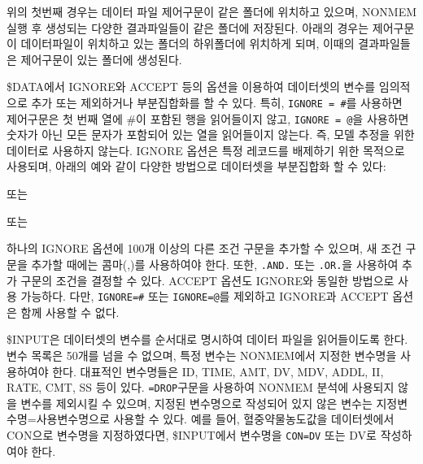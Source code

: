 \documentclass[
  10pt,
  krantz2,
  a4paper]{krantz}
\newenvironment{Shaded}{\begin{snugshade}}{\end{snugshade}}
\newcommand{\CommentTok}[1]{\textcolor[rgb]{0.56,0.35,0.01}{\textit{#1}}}
\newcommand{\NormalTok}[1]{#1}
\newcommand{\OperatorTok}[1]{\textcolor[rgb]{0.81,0.36,0.00}{\textbf{#1}}}
\newcommand{\StringTok}[1]{\textcolor[rgb]{0.31,0.60,0.02}{#1}}
\theoremstyle{definition}
\theoremstyle{definition}
\theoremstyle{definition}
\theoremstyle{remark}
\begin{document}
위의 첫번째 경우는 데이터 파일 제어구문이 같은 폴더에 위치하고 있으며, NONMEM 실행 후 생성되는 다양한 결과파일들이 같은 폴더에 저장된다. 아래의 경우는 제어구문이 데이터파일이 위치하고 있는 폴더의 하위폴더에 위치하게 되며, 이때의 결과파일들은 제어구문이 있는 폴더에 생성된다.

\$DATA에서 IGNORE와 ACCEPT 등의 옵션을 이용하여 데이터셋의 변수를 임의적으로 추가 또는 제외하거나 부분집합화를 할 수 있다. 특히, \texttt{IGNORE\ =\ \#}를 사용하면 제어구문은 첫 번째 열에 \#이 포함된 행을 읽어들이지 않고, \texttt{IGNORE\ =\ @}을 사용하면 숫자가 아닌 모든 문자가 포함되어 있는 열을 읽어들이지 않는다. 즉, 모델 추정을 위한 데이터로 사용하지 않는다. IGNORE 옵션은 특정 레코드를 배제하기 위한 목적으로 사용되며, 아래의 예와 같이 다양한 방법으로 데이터셋을 부분집합화 할 수 있다:

\begin{Shaded}
\end{Shaded}

또는

\begin{Shaded}
\end{Shaded}

또는

\begin{Shaded}
\end{Shaded}

하나의 IGNORE 옵션에 100개 이상의 다른 조건 구문을 추가할 수 있으며, 새 조건 구문을 추가할 때에는 콤마(,)를 사용하여야 한다. 또한, \texttt{.AND.} 또는 \texttt{.OR.}을 사용하여 추가 구문의 조건을 결정할 수 있다. ACCEPT 옵션도 IGNORE와 동일한 방법으로 사용 가능하다. 다만, \texttt{IGNORE=\#} 또는 \texttt{IGNORE=@}를 제외하고 IGNORE과 ACCEPT 옵션은 함께 사용할 수 없다.

\$INPUT은 데이터셋의 변수를 순서대로 명시하여 데이터 파일을 읽어들이도록 한다. 변수 목록은 50개를 넘을 수 없으며, 특정 변수는 NONMEM에서 지정한 변수명을 사용하여야 한다. 대표적인 변수명들은 ID, TIME, AMT, DV, MDV, ADDL, II, RATE, CMT, SS 등이 있다. \texttt{=DROP}구문을 사용하여 NONMEM 분석에 사용되지 않을 변수를 제외시킬 수 있으며, 지정된 변수명으로 작성되어 있지 않은 변수는 지정변수명=사용변수명으로 사용할 수 있다. 예를 들어, 혈중약물농도값을 데이터셋에서 CON으로 변수명을 지정하였다면, \$INPUT에서 변수명을 \texttt{CON=DV} 또는 DV로
작성하여야 한다.
\end{document}
